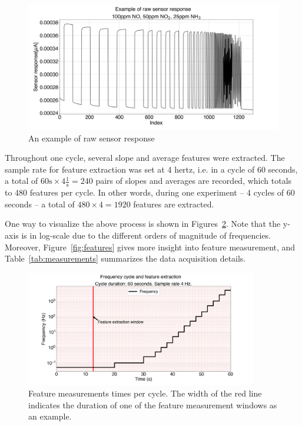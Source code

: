 \begin{figure}[!htb]
	\centering
	\includegraphics[width=1\textwidth]{../figures/raw-response.png}
	\caption{An example of raw sensor response}
	\label{fig:raw}
\end{figure}

Throughout one cycle, several slope and average features were extracted. The sample rate for feature extraction was set at 4 \acrshort{hertz}, i.e. in a cycle of 60 seconds, a total of $60 \text{s} \times 4 \frac{1}{\text{s}} = 240$ pairs of slopes and averages are recorded, which totals to 480 features per cycle. In other words, during one experiment --  4 cycles of 60 seconds -- a total of $480 \times 4 = 1920$ features are extracted. 

One way to visualize the above process is shown in Figures~\ref{fig:feat-window}. Note that the y-axis is in log-scale due to the different orders of magnitude of frequencies. Moreover, Figure~\ref{fig:features} gives more insight into feature measurement, and Table~\ref{tab:measurements} summarizes the data acquisition details.

\hspace{2mm}

\begin{figure}[!htb]
	\centering
	\includegraphics[width=0.9\textwidth]{../figures/measurement-windows.png}
	
	\caption{Feature measurements times per cycle. The width of the red line indicates the duration of one of the feature measurement windows as an example.}
	\label{fig:feat-window}
\end{figure} 

